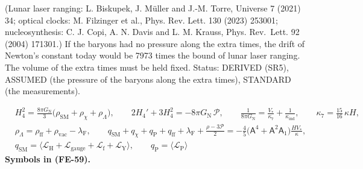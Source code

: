 \documentclass[
  10pt,
]{article}
\begin{document}
(Lunar laser ranging: L. Biskupek, J. Müller and J.-M. Torre, Universe 7
(2021) 34; optical clocks: M. Filzinger et al., Phys. Rev. Lett. 130
(2023) 253001; nucleosynthesis: C. J. Copi, A. N. Davis and L. M.
Krauss, Phys. Rev.~Lett. 92 (2004) 171301.) If the baryons had no
pressure along the extra times, the drift of Newton's constant today
would be 7973 times the bound of lunar laser ranging. The volume of the
extra times must be held fixed. Status: DERIVED (SR5), ASSUMED (the
pressure of the baryons along the extra times), STANDARD (the
measurements).

\[
\begin{aligned}
&H_4^2 = \frac{8\pi G_{\mathrm{N}}}{3}\big(\rho_{\mathrm{SM}} + \rho_\chi + \rho_\Lambda\big),\qquad
 2H_4' + 3H_4^2 = -8\pi G_{\mathrm{N}}\,\mathcal{P},\qquad
 \frac{1}{8\pi G_{\mathrm{N}}} = \frac{V_*}{\kappa_7} + \frac{1}{\kappa_{\mathrm{ind}}},\qquad \kappa_7 = \frac{15}{16}\,\kappa H,\\
&\rho_\Lambda = \rho_{\mathrm{ff}} + \rho_{\mathrm{vac}} - \lambda_{\mathrm{F}},\qquad
 q_{\mathrm{SM}} + q_\chi + q_{\mathrm{P}} + q_{\mathrm{ff}} + \lambda_{\mathrm{F}} + \frac{\rho - 3\mathcal{P}}{2}
 = -\frac45\big(\mathsf{A}^4 + \mathsf{A}^2\mathsf{A}_1\big)\frac{HV_*}{\kappa},\\
&q_{\mathrm{SM}} = \big\langle\mathcal{L}_{\mathrm{H}} + \mathcal{L}_{\mathrm{gauge}} + \mathcal{L}_{\mathrm{f}} + \mathcal{L}_{\mathrm{Y}}\big\rangle,\qquad
 q_{\mathrm{P}} = \langle\mathcal{L}_{\mathrm{P}}\rangle
\end{aligned} \tag{FE-59}
\] \textbf{Symbols in (FE-59).}
\end{document}
